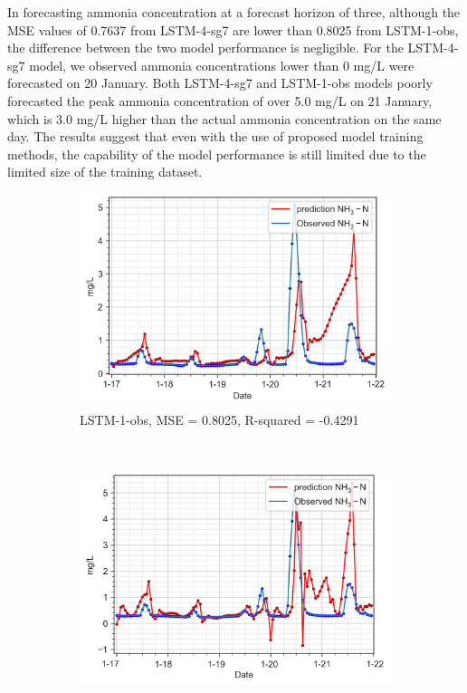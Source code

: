 In forecasting ammonia concentration at a forecast horizon of three, although the MSE values of 0.7637 from LSTM-4-sg7 are lower than 0.8025 from LSTM-1-obs, the difference between the two model performance is negligible. For the LSTM-4-sg7 model, we observed ammonia concentrations lower than 0 mg/L were forecasted on 20 January. Both LSTM-4-sg7 and LSTM-1-obs models poorly forecasted the peak ammonia concentration of over 5.0 mg/L on 21 January, which is 3.0 mg/L higher than the actual ammonia concentration on the same day. The results suggest that even with the use of proposed model training methods, the capability of the model performance is still limited due to the limited size of the training dataset.

\begin{figure}[!ht]
  \centering
  \begin{subfigure}[t]{0.75\textwidth}
    \includegraphics[width=\linewidth]{imgs/results/steps/nh3-lstm-1-fc3.png}
    \caption{LSTM-1-obs, MSE = 0.8025, R-squared = -0.4291} \label{fig:nh3-lstm-1-fc3}
  \end{subfigure}\\
  \vspace{2em}
  \begin{subfigure}[t]{0.75\textwidth}
    \includegraphics[width=\linewidth]{imgs/results/steps/nh3-lstm-4-fc3.png}

\end{subfigure}
\end{figure}
